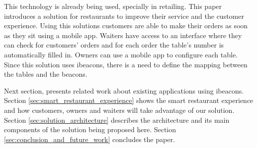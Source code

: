 This technology is already being used, specially in retailing.
This paper introduces a solution for restaurants to improve their
service and the customer experience. Using this solutions customers
are able to make their orders as soon as they sit using a mobile app.
Waiters have access to an interface where they can check for customers'
orders and for each order the table's number is automatically filled in.
Owners can use a mobile app to configure each table. Since this solution
uses ibeacons, there is a need to define the mapping between the tables
and the beacons.

Next section, presents related work about existing applications using ibeacons.
Section \ref{sec:smart_restaurant_experience} shows the smart restaurant
experience and how customers, owners and waiters will take advantage of our
solution. Section \ref{sec:solution_architecture} describes the architecture
and its main components
of the solution being proposed here.
Section \ref{sec:conclusion_and_future_work} concludes the paper.
